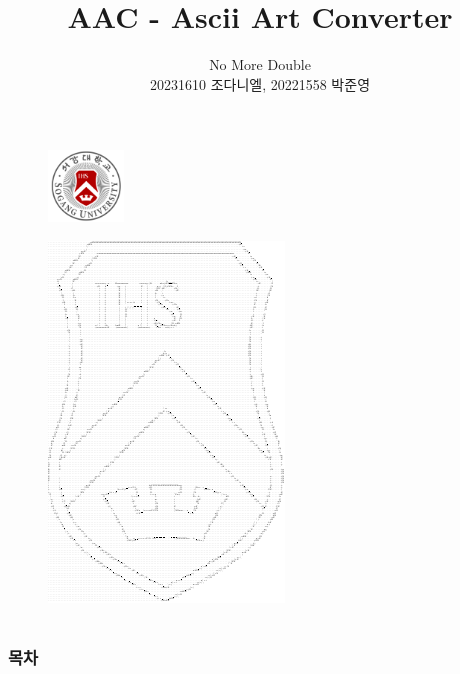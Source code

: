 \documentclass{beamer}
\title{AAC - Ascii Art Converter}
\author{No More Double \\ 20231610 조다니엘, 20221558 박준영}
\date{\displaydate{date}}
\institute{Sogang University \\ CSE2035/AIE2051}
\begin{document}
\section{}
\begin{frame}{}
	\titlepage
	\begin{figure}
		\vspace{-1em}
		\includegraphics[width=2cm]{SogangUniversityLogo}
		\vspace{1em}
	\end{figure}
\end{frame}

\begin{frame}
	\begin{figure}
		\centering
		\includegraphics[height=\paperheight]{../report/ascii_logo_1.pdf}
	\end{figure}
\end{frame}

\section{}
\begin{frame}{}
	\frametitle{목차}
	\tableofcontents
\end{frame}
\end{document}
